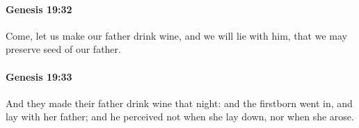 		\paragraph{Genesis 19:32} %
			\label{GENESIS-19-32}

			Come, let us make our father drink wine, and we will lie with him, that we may preserve seed of our father.


		\paragraph{Genesis 19:33} %
			\label{GENESIS-19-33}

			And they made their father drink wine that night: and the firstborn went in, and lay with her father; and he perceived not when she lay down, nor when she arose.


